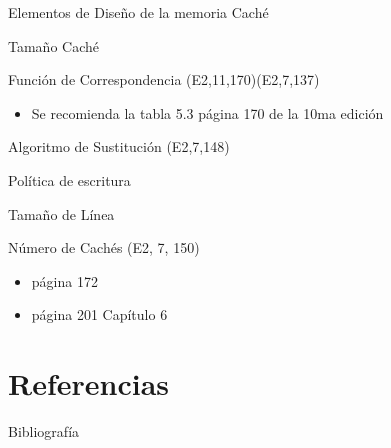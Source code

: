 \documentclass[presentation]{beamer}
\begin{document}
\begin{frame}[label={sec:orgc8662c8}]{Elementos de Diseño de la memoria Caché}
\end{frame}
\begin{frame}[label={sec:org3ed5649}]{Tamaño Caché}
\end{frame}
\begin{frame}[label={sec:org7ad22ee}]{Función de Correspondencia (E2,11,170)(E2,7,137)}
\begin{itemize}
\item Se recomienda la tabla 5.3 página 170 de la 10ma edición
\end{itemize}
\end{frame}
\begin{frame}[label={sec:org9989dd4}]{Algoritmo de Sustitución (E2,7,148)}
\end{frame}
\begin{frame}[label={sec:orgc6c32c5}]{Política de escritura}
\end{frame}
\begin{frame}[label={sec:orgbf03ad7}]{Tamaño de Línea}
\end{frame}
\begin{frame}[label={sec:org900b23e}]{Número de Cachés (E2, 7, 150)}
\begin{itemize}
\item \autocite{stallings2006} página 172
\item \autocite{stallings2022computer} página 201 Capítulo 6
\end{itemize}
\end{frame}

\section{Referencias}
\label{sec:orgab3e7f6}
\begin{frame}[allowframebreaks]{Bibliografía}
\printbibliography
\end{frame}
\end{document}
